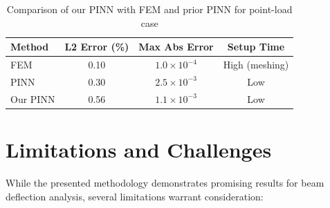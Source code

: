 \documentclass[12pt]{article}
\begin{document}
\begin{table}[htbp]
	\centering
	\begin{tabular}{l c c c}
		\toprule
		\textbf{Method} & \textbf{L2 Error (\%)} & \textbf{Max Abs Error} & \textbf{Setup Time} \\
		\midrule
		FEM & 0.10 & $1.0 \times 10^{-4}$ & High (meshing) \\
		PINN \citep{Zhang2020} & 0.30 & $2.5 \times 10^{-3}$ & Low \\
		Our PINN & 0.56 & $1.1 \times 10^{-3}$ & Low \\
		\bottomrule
	\end{tabular}
	\caption{Comparison of our PINN with FEM and prior PINN for point-load case}
	\label{tab:comparison}
\end{table}



\section{Limitations and Challenges}
While the presented methodology demonstrates promising results for beam deflection analysis, several limitations warrant consideration:
\end{document}
